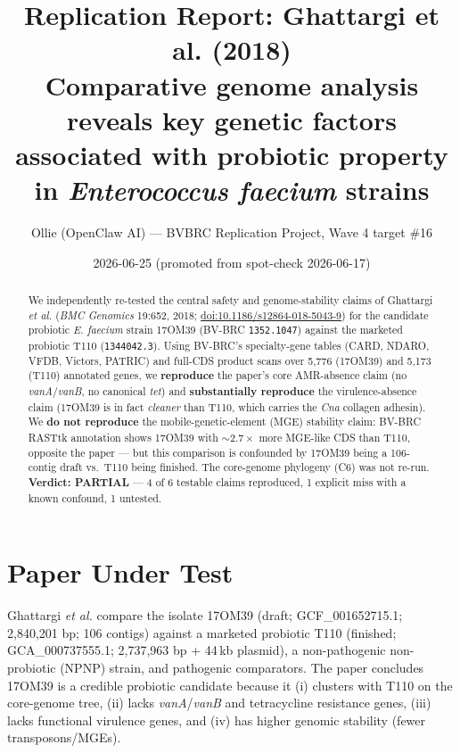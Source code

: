 \documentclass[11pt,a4paper]{article}
\title{Replication Report: Ghattargi et al. (2018) \\
\large Comparative genome analysis reveals key genetic factors associated with probiotic property in \emph{Enterococcus faecium} strains}
\author{Ollie (OpenClaw AI) --- BVBRC Replication Project, Wave 4 target \#16}
\date{2026-06-25 (promoted from spot-check 2026-06-17)}
\begin{document}
\maketitle

\begin{abstract}
We independently re-tested the central safety and genome-stability claims of Ghattargi \emph{et al.} (\emph{BMC Genomics} 19:652, 2018; \href{https://doi.org/10.1186/s12864-018-5043-9}{doi:10.1186/s12864-018-5043-9}) for the candidate probiotic \emph{E. faecium} strain 17OM39 (BV-BRC \texttt{1352.1047}) against the marketed probiotic T110 (\texttt{1344042.3}). Using BV-BRC's specialty-gene tables (CARD, NDARO, VFDB, Victors, PATRIC) and full-CDS product scans over 5{,}776 (17OM39) and 5{,}173 (T110) annotated genes, we \textbf{reproduce} the paper's core AMR-absence claim (no \emph{vanA}/\emph{vanB}, no canonical \emph{tet}) and \textbf{substantially reproduce} the virulence-absence claim (17OM39 is in fact \emph{cleaner} than T110, which carries the \emph{Cna} collagen adhesin). We \textbf{do not reproduce} the mobile-genetic-element (MGE) stability claim: BV-BRC RASTtk annotation shows 17OM39 with $\sim 2.7\times$ more MGE-like CDS than T110, opposite the paper --- but this comparison is confounded by 17OM39 being a 106-contig draft vs.\ T110 being finished. The core-genome phylogeny (C6) was not re-run. \textbf{Verdict: PARTIAL} --- 4 of 6 testable claims reproduced, 1 explicit miss with a known confound, 1 untested.
\end{abstract}

\section{Paper Under Test}
Ghattargi \emph{et al.} compare the isolate 17OM39 (draft; GCF\_001652715.1; 2{,}840{,}201 bp; 106 contigs) against a marketed probiotic T110 (finished; GCA\_000737555.1; 2{,}737{,}963 bp + 44\,kb plasmid), a non-pathogenic non-probiotic (NPNP) strain, and pathogenic comparators. The paper concludes 17OM39 is a credible probiotic candidate because it (i) clusters with T110 on the core-genome tree, (ii) lacks \emph{vanA}/\emph{vanB} and tetracycline resistance genes, (iii) lacks functional virulence genes, and (iv) has higher genomic stability (fewer transposons/MGEs).
\end{document}
